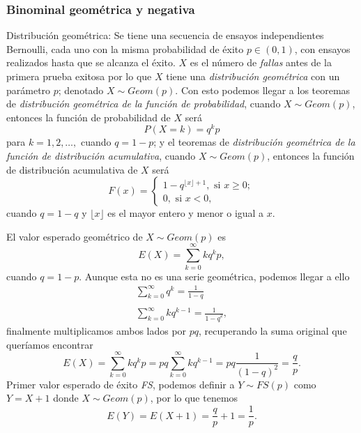 
\subsubsection {Binominal geométrica y negativa}
Distribución geométrica: Se tiene una secuencia de ensayos independientes Bernoulli, cada uno con la misma probabilidad de éxito $p\in(0,1)$, con ensayos realizados hasta que se alcanza el éxito. $X$ es el número de \emph{fallas} antes de la primera prueba exitosa por lo que $X$ tiene una \emph{distribución geométrica} con un parámetro $p$; denotado $X\sim Geom(p)$. Con esto podemos llegar a los teoremas de \emph{distribución geométrica de la función de probabilidad}, cuando $X\sim Geom(p)$, entonces la función de probabilidad de $X$ será
\begin{equation}
P(X=k)=q^kp
\end{equation}
para $k=1,2,\ldots,$ cuando $q=1-p$; y el teoremas de \emph{distribución geométrica de la función de distribución acumulativa}, cuando $X\sim Geom(p)$, entonces la función de distribución acumulativa de $X$ será
    \begin{equation}
    F(x)=
    \begin{cases}
    1-q^{\lfloor x\rfloor+1}, \text{ si } x\geq 0;\\
    0, \text{ si }x < 0,
    \end{cases}
    \end{equation}
cuando $q=1-q$ y $\lfloor x\rfloor$ es el mayor entero y menor o igual a $x$.

El valor esperado geométrico de $X\sim Geom(p)$ es
\begin{equation}
E(X)=\sum_{k=0}^{\infty}kq^kp,
\end{equation}
cuando $q=1-p$. Aunque esta no es una serie geométrica, podemos llegar a ello
\begin{equation}\begin{matrix}
\sum_{k=0}^{\infty}q^k=\frac{1}{1-q}\\
\\
\sum_{k=0}^{\infty}kq^{k-1}=\frac{1}{{1-q}^2},
\end{matrix}
\end{equation}
finalmente multiplicamos ambos lados por $pq$, recuperando la suma original que queríamos encontrar
\begin{equation}
E(X)=\sum_{k=0}^{\infty}kq^kp=pq\sum_{k=0}^{\infty}kq^{k-1}=pq\frac{1}{{(1-q)}^2}=\frac{q}{p}.
\end{equation}
Primer valor esperado de éxito \emph{FS}, podemos definir a $Y\sim FS(p)$ como $Y=X+1$ donde $X\sim Geom(p)$, por lo que tenemos
\begin{equation}
E(Y)=E(X+1)=\frac{q}{p}+1=\frac{1}{p}.
\end{equation}


